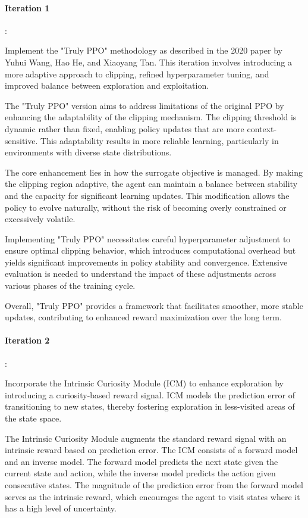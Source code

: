 \documentclass[
12pt, %
oneside, %
english, %
onehalfspacing, %
nolistspacing, %
liststotoc, %
headsepline, %
]{ProposalAndThesis} %
\begin{document}
\paragraph{Iteration 1}:
    
Implement the "Truly PPO" methodology as described in the 2020 paper by Yuhui Wang, Hao He, and Xiaoyang Tan. This iteration involves introducing a more adaptive approach to clipping, refined hyperparameter tuning, and improved balance between exploration and exploitation.

The "Truly PPO" version aims to address limitations of the original PPO by enhancing the adaptability of the clipping mechanism. The clipping threshold is dynamic rather than fixed, enabling policy updates that are more context-sensitive. This adaptability results in more reliable learning, particularly in environments with diverse state distributions.

The core enhancement lies in how the surrogate objective is managed. By making the clipping region adaptive, the agent can maintain a balance between stability and the capacity for significant learning updates. This modification allows the policy to evolve naturally, without the risk of becoming overly constrained or excessively volatile.

Implementing "Truly PPO" necessitates careful hyperparameter adjustment to ensure optimal clipping behavior, which introduces computational overhead but yields significant improvements in policy stability and convergence. Extensive evaluation is needed to understand the impact of these adjustments across various phases of the training cycle.

Overall, "Truly PPO" provides a framework that facilitates smoother, more stable updates, contributing to enhanced reward maximization over the long term.

\paragraph{Iteration 2}:
    
Incorporate the Intrinsic Curiosity Module (ICM) to enhance exploration by introducing a curiosity-based reward signal. ICM models the prediction error of transitioning to new states, thereby fostering exploration in less-visited areas of the state space.

The Intrinsic Curiosity Module augments the standard reward signal with an intrinsic reward based on prediction error. The ICM consists of a forward model and an inverse model. The forward model predicts the next state given the current state and action, while the inverse model predicts the action given consecutive states. The magnitude of the prediction error from the forward model serves as the intrinsic reward, which encourages the agent to visit states where it has a high level of uncertainty.
\end{document}
